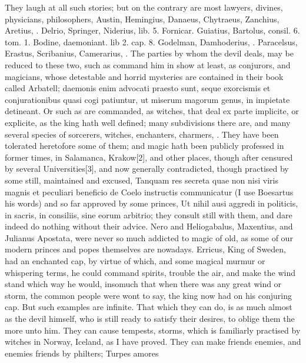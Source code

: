 {{They laugh at all such stories; but on the contrary are most lawyers,
divines, physicians, philosophers, Austin, Hemingius, Danaeus,
Chytraeus, Zanchius, Aretius, \etc{}. Delrio, Springer, Niderius,
lib. 5. Fornicar. Guiatius, Bartolus, consil. 6. tom. 1. Bodine,
daemoniant. lib 2. cap. 8. Godelman, Damhoderius, \etc{}. Paracelsus,
Erastus, Scribanius, Camerarius, \etc{}. The parties by whom the devil
deals, may be reduced to these two, such as command him in show at
least, as conjurors, and magicians, whose detestable and horrid
mysteries are contained in their book called Arbatell; daemonis
enim advocati praesto sunt, seque exorcismis et conjurationibus quasi
cogi patiuntur, ut miserum magorum genus, in impietate detineant. Or
such as are commanded, as witches, that deal ex parte implicite, or
explicite, as the king hath well defined; many subdivisions there
are, and many several species of sorcerers, witches, enchanters,
charmers, \etc{}. They have been tolerated heretofore some of them; and
magic hath been publicly professed in former times, in Salamanca,
Krakow[2\baselineskip], and other places, though after censured by several
Universities[3\baselineskip], and now generally contradicted, though practised by
some still, maintained and excused, Tanquam res secreta quae non nisi
viris magnis et peculiari beneficio de Coelo instructis communicatur (I
use Boesartus his words) and so far approved by some princes, Ut
nihil ausi aggredi in politicis, in sacris, in consiliis, sine eorum
arbitrio; they consult still with them, and dare indeed do nothing
without their advice. Nero and Heliogabalus, Maxentius, and Julianus
Apostata, were never so much addicted to magic of old, as some of our
modern princes and popes themselves are nowadays. Erricus, King of
Sweden, had an enchanted cap, by virtue of which, and some
magical murmur or whispering terms, he could command spirits, trouble
the air, and make the wind stand which way he would, insomuch that when
there was any great wind or storm, the common people were wont to say,
the king now had on his conjuring cap. But such examples are infinite.
That which they can do, is as much almost as the devil himself, who is
still ready to satisfy their desires, to oblige them the more unto him.
They can cause tempests, storms, which is familiarly practised by
witches in Norway, Iceland, as I have proved. They can make friends
enemies, and enemies friends by philters; Turpes amores
}}
